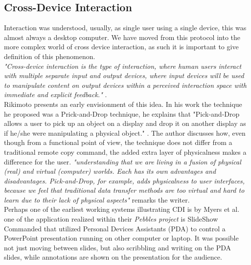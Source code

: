 \subsection{Cross-Device Interaction}
Interaction was understood, usually, as single user using a single device, this was almost always a desktop computer\cite{Levin:2014}. We have moved from this protocol into the more complex world of cross device interaction, as such it is important to give definition of this phenomenon.\\

\emph{"Cross-device interaction is the type of interaction, where human users interact with multiple separate input and output devices, where input devices will be used to manipulate content on output devices within a perceived interaction space with immediate and explicit feedback."} \cite{Scharf:2013}.\\

Rikimoto presents an early envisionment of this idea. In his work the technique he proposed was a Prick-and-Drop technique, he explains that "Pick-and-Drop allows a user to pick up an object on a display and drop it on another display as if he/she were manipulating a physical object." \cite{Rekimoto:1997}. The author discusses how, even though from a functional point of view, the technique does not differ from a traditional remote copy command, the added extra layer of physicalness makes a difference for the user. \emph{"understanding that we are living in a fusion of physical (real) and virtual (computer) worlds. Each has its own advantages and disadvantages. Pick-and-Drop, for example, adds physicalness to user interfaces, because we feel that traditional data transfer methods are too virtual and hard to learn due to their lack of physical aspects"} \cite{Rekimoto:1997} remarks the writer.\\

Perhaps one of the earliest working systems illustrating CDI is by Myers et al.
\cite{Myers:2001} one of the application realized within their \emph{Pebbles project} is SlideShow Commanded that utilized Personal Devices Assistants (PDA) to control a PowerPoint presentation running on other computer or laptop.
It was possible not just moving between slides, but also scribbling and writing on the PDA slides, while annotations are shown on the presentation for the audience.\\

